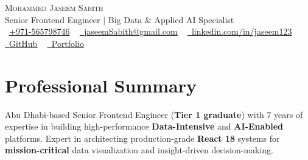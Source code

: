 \documentclass[letterpaper,12pt]{article}
\begin{document}
\begin{center}
    {\Huge \scshape Mohammed Jaseem Sabith} \\ \vspace{2pt}
    \large Senior Frontend Engineer $|$ Big Data \& Applied AI Specialist \\ \vspace{2pt}
    \small \raisebox{-0.1\height}\faPhone\ \href{tel:+971565798746}{+971-565798746} ~ \href{mailto:jaseemSabith@gmail.com}{\raisebox{-0.2\height}\faEnvelope\  \underline{jaseemSabith@gmail.com}} ~ 
    \href{https://www.linkedin.com/in/jaseem123/}{\raisebox{-0.2\height}\faLinkedin\ \underline{linkedin.com/in/jaseem123}} \\ \vspace{0pt}
    \href{https://github.com/Jaseem8}{\raisebox{-0.2\height}\faGithub\ \underline{GitHub}} ~
    \href{https://jaseem8.github.io/}{\raisebox{-0.2\height}\faGlobe\ \underline{Portfolio}}
    \vspace{-4pt}
\end{center}

\section{Professional Summary}
\vspace{-2pt}
\small{
    Abu Dhabi-based Senior Frontend Engineer (\textbf{Tier 1 graduate}) with 7 years of expertise in building high-performance \textbf{Data-Intensive} and \textbf{AI-Enabled} platforms. Expert in architecting production-grade \textbf{React 18} systems for \textbf{mission-critical} data visualization and insight-driven decision-making. 
}
\vspace{-6pt}

\end{document}
